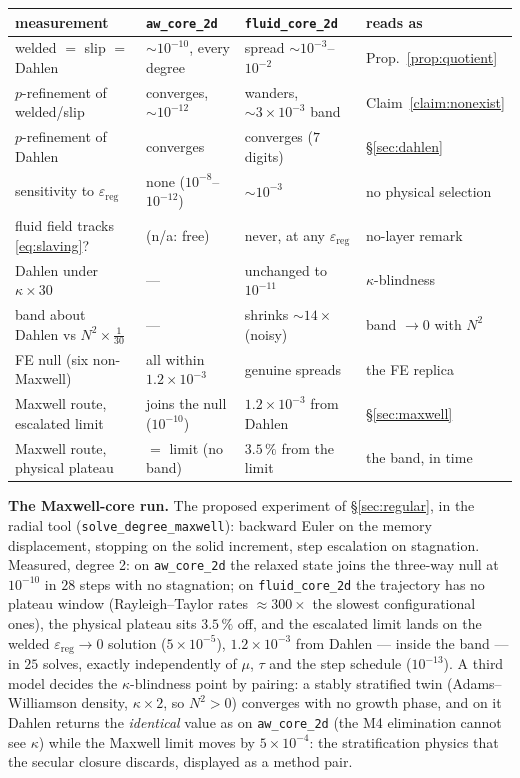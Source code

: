 \documentclass[11pt]{article}
\newcommand{\eps}{\varepsilon}
\newcommand{\code}[1]{\texttt{#1}}
\begin{document}
\begin{center}
\small
\begin{tabular}{@{}llll@{}}
\toprule
measurement & \code{aw\_core\_2d} & \code{fluid\_core\_2d} & reads as \\
\midrule
welded $=$ slip $=$ Dahlen & $\sim 10^{-10}$, every degree &
  spread $\sim 10^{-3}$--$10^{-2}$ & Prop.~\ref{prop:quotient} \\
$p$-refinement of welded/slip & converges, $\sim 10^{-12}$ &
  wanders, $\sim 3\times 10^{-3}$ band & Claim~\ref{claim:nonexist} \\
$p$-refinement of Dahlen & converges & converges ($7$ digits) &
  \S\ref{sec:dahlen} \\
sensitivity to $\eps_{\mathrm{reg}}$ & none ($10^{-8}$--$10^{-12}$) &
  $\sim 10^{-3}$ & no physical selection \\
fluid field tracks \eqref{eq:slaving}? & (n/a: free) & never, at any
  $\eps_{\mathrm{reg}}$ & no-layer remark \\
Dahlen under $\kappa \times 30$ & --- & unchanged to $10^{-11}$ &
  $\kappa$-blindness \\
band about Dahlen vs $N^2\times\frac{1}{30}$ & --- & shrinks
  $\sim 14\times$ (noisy) & band $\to 0$ with $N^2$ \\
FE null (six non-Maxwell) & all within $1.2\times10^{-3}$ &
  genuine spreads & the FE replica \\
Maxwell route, escalated limit & joins the null ($10^{-10}$) &
  $1.2\times10^{-3}$ from Dahlen & \S\ref{sec:maxwell} \\
Maxwell route, physical plateau & $=$ limit (no band) &
  $3.5\,\%$ from the limit & the band, in time \\
\bottomrule
\end{tabular}
\end{center}

\medskip\noindent
\textbf{The Maxwell-core run.} The proposed experiment of
\S\ref{sec:regular}, in the radial tool
(\code{solve\_degree\_maxwell}): backward Euler on the memory
displacement, stopping on the solid increment, step escalation on
stagnation. Measured, degree 2: on \code{aw\_core\_2d} the relaxed
state joins the three-way null at $10^{-10}$ in $28$ steps with no
stagnation; on \code{fluid\_core\_2d} the trajectory has no plateau
window (Rayleigh--Taylor rates $\approx 300\times$ the slowest
configurational ones), the physical plateau sits $3.5\,\%$ off, and
the escalated limit lands on the welded $\eps_{\mathrm{reg}} \to 0$
solution ($5\times10^{-5}$), $1.2\times10^{-3}$ from Dahlen ---
inside the band --- in $25$ solves, exactly independently of $\mu$,
$\tau$ and the step schedule ($10^{-13}$). A third model decides the
$\kappa$-blindness point by pairing: a stably stratified twin
(Adams--Williamson density, $\kappa \times 2$, so $N^2 > 0$)
converges with no growth phase, and on it Dahlen returns the
\emph{identical} value as on \code{aw\_core\_2d} (the M4 elimination
cannot see $\kappa$) while the Maxwell limit moves by
$5\times10^{-4}$: the stratification physics that the secular closure
discards, displayed as a method pair.
\end{document}

